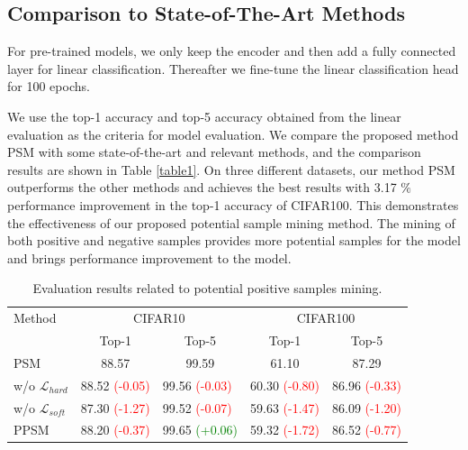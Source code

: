 \documentclass[review]{elsarticle}
\begin{document}
\subsection{Comparison to State-of-The-Art Methods}
For pre-trained models, we only keep the encoder and then add a fully connected layer for linear classification. Thereafter we fine-tune the linear classification head for 100 epochs.


We use the top-1 accuracy and top-5 accuracy obtained from the linear evaluation as the criteria for model evaluation. We compare the proposed method PSM with some state-of-the-art and relevant methods, and the comparison results are shown in Table \ref{table1}. On three different datasets, our method PSM outperforms the other methods and achieves the best results with 3.17 $\%$ performance improvement in the top-1 accuracy of CIFAR100. This demonstrates the effectiveness of our proposed potential sample mining method. The mining of both positive and negative samples provides more potential samples for the model and brings performance improvement to the model.


\begin{table}[]
\caption{Evaluation results related to potential positive samples mining.}
\label{table2}
\begin{center}
\begin{tabular}{lllllllll}
\hline
Method    & \multicolumn{4}{c}{CIFAR10}                           & \multicolumn{4}{c}{CIFAR100}                          \\ \cline{2-9} 
          & \multicolumn{2}{c}{Top-1} & \multicolumn{2}{c}{Top-5} & \multicolumn{2}{c}{Top-1} & \multicolumn{2}{c}{Top-5} \\ \hline
PSM       & \multicolumn{2}{c}{88.57} & \multicolumn{2}{c}{99.59} & \multicolumn{2}{c}{61.10} & \multicolumn{2}{c}{87.29} \\
w/o $\mathcal{L} _{hard}$ & \multicolumn{2}{l}{88.52 \textcolor{red}{(-0.05)}} & \multicolumn{2}{l}{99.56 \textcolor{red}{(-0.03)}} & \multicolumn{2}{l}{60.30 \textcolor{red}{(-0.80)}} & \multicolumn{2}{l}{86.96 \textcolor{red}{(-0.33)}  } \\

w/o $\mathcal{L} _{soft}$ & \multicolumn{2}{l}{87.30 \textcolor{red}{(-1.27)}} & \multicolumn{2}{l}{99.52 \textcolor{red}{(-0.07)}} & \multicolumn{2}{l}{59.63 \textcolor{red}{(-1.47)}} & \multicolumn{2}{l}{86.09 \textcolor{red}{(-1.20)} } \\ 

\hline
PPSM & \multicolumn{2}{l}{88.20 \textcolor{red}{(-0.37)}} & \multicolumn{2}{l}{99.65 \textcolor{green}{(+0.06)}} & \multicolumn{2}{l}{59.32 \textcolor{red}{(-1.72)}} & \multicolumn{2}{l}{86.52 \textcolor{red}{(-0.77)} } \\ 

\hline
\end{tabular}
\end{center}
\end{table}
\end{document}
